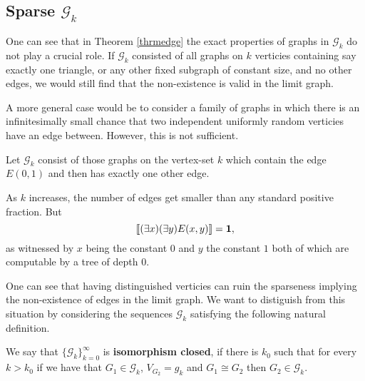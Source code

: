 \subsection{Sparse $\mathcal{G}_k$}

One can see that in Theorem \ref{thrmedge} the exact properties of graphs in $\mathcal{G}_k$ do not play a crucial role. If $\mathcal{G}_k$ consisted of all graphs on $k$ verticies containing say exactly one triangle, or any other fixed subgraph of constant size, and no other edges, we would still find that the non-existence is valid in the limit graph.

A more general case would be to consider a family of graphs in which there is an infinitesimally small chance that two independent uniformly random verticies have an edge between. However, this is not sufficient.

\begin{exam}
Let $\mathcal{G}_k$ consist of those graphs on the vertex-set $k$ which contain the edge $E(0,1)$ and then has exactly one other edge. 

As $k$ increases, the number of edges get smaller than any standard positive fraction. But
\[\llbracket(\exists x)(\exists y)E(x,y)\rrbracket=\textbf{1},\]
as witnessed by $x$ being the constant $0$ and $y$ the constant $1$ both of which are computable by a tree of depth $0$.
\end{exam}

One can see that having distinguished verticies can ruin the sparseness implying the non-existence of edges in the limit graph. We want to distiguish from this situation by considering the sequences $\mathcal{G}_k$ satisfying the following natural definition.

\begin{defi}
We say that $\{\mathcal{G}_k\}_{k=0}^\infty$ is \textbf{isomorphism closed}, if there is $k_0$ such that for every $k>k_0$ if we have that $G_1\in\mathcal{G}_k$, $V_{G_2}=g_k$ and $G_1\cong G_2$ then $G_2\in\mathcal{G}_k$.
\end{defi}


